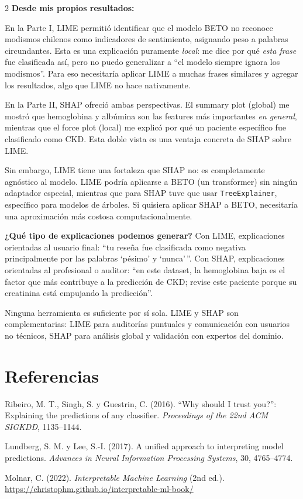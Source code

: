 \documentclass[12pt, a4paper]{article}
\begin{document}
\begin{multicols}{2}
\textbf{Desde mis propios resultados:}

En la Parte I, LIME permitió identificar que el modelo BETO no reconoce modismos chilenos como indicadores de sentimiento, asignando peso a palabras circundantes. Esta es una explicación puramente \textit{local}: me dice por qué \textit{esta frase} fue clasificada así, pero no puedo generalizar a ``el modelo siempre ignora los modismos''. Para eso necesitaría aplicar LIME a muchas frases similares y agregar los resultados, algo que LIME no hace nativamente.

En la Parte II, SHAP ofreció ambas perspectivas. El summary plot (global) me mostró que hemoglobina y albúmina son las features más importantes \textit{en general}, mientras que el force plot (local) me explicó por qué un paciente específico fue clasificado como CKD. Esta doble vista es una ventaja concreta de SHAP sobre LIME.

Sin embargo, LIME tiene una fortaleza que SHAP no: es completamente agnóstico al modelo. LIME podría aplicarse a BETO (un transformer) sin ningún adaptador especial, mientras que para SHAP tuve que usar \texttt{TreeExplainer}, específico para modelos de árboles. Si quisiera aplicar SHAP a BETO, necesitaría una aproximación más costosa computacionalmente.

\textbf{¿Qué tipo de explicaciones podemos generar?} Con LIME, explicaciones orientadas al usuario final: ``tu reseña fue clasificada como negativa principalmente por las palabras `pésimo' y `nunca'\,''. Con SHAP, explicaciones orientadas al profesional o auditor: ``en este dataset, la hemoglobina baja es el factor que más contribuye a la predicción de CKD; revise este paciente porque su creatinina está empujando la predicción''.

Ninguna herramienta es suficiente por sí sola. LIME y SHAP son complementarias: LIME para auditorías puntuales y comunicación con usuarios no técnicos, SHAP para análisis global y validación con expertos del dominio.

\section*{Referencias}

\begin{enumerate}[leftmargin=1.5em, label={[\arabic*]}, itemsep=2pt]
    \item Ribeiro, M. T., Singh, S. y Guestrin, C. (2016). ``Why should I trust you?'': Explaining the predictions of any classifier. \textit{Proceedings of the 22nd ACM SIGKDD}, 1135--1144.

    \item Lundberg, S. M. y Lee, S.-I. (2017). A unified approach to interpreting model predictions. \textit{Advances in Neural Information Processing Systems}, 30, 4765--4774.

    \item Molnar, C. (2022). \textit{Interpretable Machine Learning} (2nd ed.). \url{https://christophm.github.io/interpretable-ml-book/}
\end{enumerate}

\end{multicols}
\end{document}

